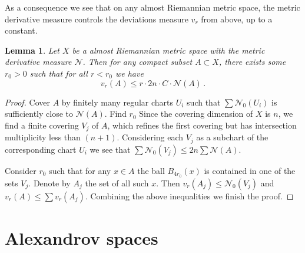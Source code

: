 \documentclass[12pt,leqno]{amsart}
\numberwithin{equation}{section}
\newtheorem{lem}[thm]{Lemma}
\theoremstyle{definition}
\theoremstyle{remark}
\begin{document}
As a consequence we see that on any almost Riemannian metric space, the metric derivative measure controls the deviations measure $v_r$ from above, up to a constant.





\begin{lem} \label{cor-mu-dc}
Let $X$ be a almost Riemannian metric space with the metric derivative measure $\mathcal N$.
Then for any compact subset $A\subset X$, there exists some $r_0>0$ such that for all
$r<r_0$ we have $$v_r (A) \leq r\cdot 2n\cdot C\cdot \mathcal N (A)\,. $$
\end{lem}


\begin{proof}
Cover $A$ by finitely many regular charts $U_i$ such that $\sum \mathcal N_0 (U_i)$ is sufficiently close to $\mathcal N (A)$. Find $r_0$
Since the covering dimension of $X$ is $n$, we find   a finite covering $V_j$ of $A$, which refines  the first covering but has intersection multiplicity less than $(n+1)$.  Considering each $V_j$ as a subchart of the corresponding chart $U_i$ we see that $\sum \mathcal N_0 (V_j) \leq 2n \sum \mathcal N(A)$.

Consider $r_0$ such that for any $x\in A$ the ball $B_{4r_0} (x)$ is contained in one of the sets $V_j$.   Denote by $A_j$ the set of all such $x$.
Then $v_r (A_j) \leq  \mathcal N_0 (V_j)$ and $v_r (A) \leq \sum v_r (A_j)$.  Combining the above inequalities we finish the proof.
\end{proof}















\section{Alexandrov spaces} \label{sec:Alex}
\end{document}
